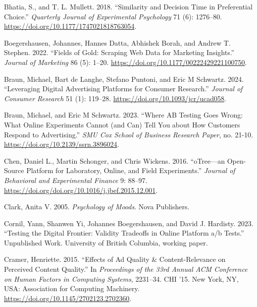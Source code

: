 \documentclass[
  a4paper,
]{scrreprt}
\newlength{\cslhangindent}
\newlength{\cslentryspacingunit} %
\newenvironment{CSLReferences}[2] %
 {%
  \setlength{\parindent}{0pt}
  \ifodd #1
  \let\oldpar\par
  \def\par{\hangindent=\cslhangindent\oldpar}
  \fi
  \setlength{\parskip}{#2\cslentryspacingunit}
 }%
 {}
\begin{document}
\begin{CSLReferences}{1}{0}
\leavevmode{}%
Bhatia, S., and T. L. Mullett. 2018. {``Similarity and Decision Time in
Preferential Choice.''} \emph{Quarterly Journal of Experimental
Psychology} 71 (6): 1276--80.
\url{https://doi.org/10.1177/1747021818763054}.

\leavevmode{}%
Boegershausen, Johannes, Hannes Datta, Abhishek Borah, and Andrew T.
Stephen. 2022. {``Fields of Gold: Scraping Web Data for Marketing
Insights.''} \emph{Journal of Marketing} 86 (5): 1--20.
\url{https://doi.org/10.1177/00222429221100750}.

\leavevmode{}%
Braun, Michael, Bart de Langhe, Stefano Puntoni, and Eric M Schwartz.
2024. {``Leveraging Digital Advertising Platforms for Consumer
Research.''} \emph{Journal of Consumer Research} 51 (1): 119--28.
\url{https://doi.org/10.1093/jcr/ucad058}.

\leavevmode{}%
Braun, Michael, and Eric M Schwartz. 2023. {``Where AB Testing Goes
Wrong: What Online Experiments Cannot (and Can) Tell You about How
Customers Respond to Advertising.''} \emph{SMU Cox School of Business
Research Paper}, no. 21-10. \url{https://doi.org/10.2139/ssrn.3896024}.

\leavevmode{}%
Chen, Daniel L., Martin Schonger, and Chris Wickens. 2016. {``oTree---an
Open-Source Platform for Laboratory, Online, and Field Experiments.''}
\emph{Journal of Behavioral and Experimental Finance} 9: 88--97.
\url{https://doi.org/doi.org/10.1016/j.jbef.2015.12.001}.

\leavevmode{}%
Clark, Anita V. 2005. \emph{Psychology of Moods}. Nova Publishers.

\leavevmode{}%
Cornil, Yann, Shanwen Yi, Johannes Boegershausen, and David J. Hardisty.
2023. {``Testing the Digital Frontier: Validity Tradeoffs in Online
Platform a/b Tests.''} Unpublished Work. University of British Columbia,
working paper.

\leavevmode{}%
Cramer, Henriette. 2015. {``Effects of Ad Quality \& Content-Relevance
on Perceived Content Quality.''} In \emph{Proceedings of the 33rd Annual
ACM Conference on Human Factors in Computing Systems}, 2231--34. CHI
'15. New York, NY, USA: Association for Computing Machinery.
\url{https://doi.org/10.1145/2702123.2702360}.


\end{CSLReferences}
\end{document}
